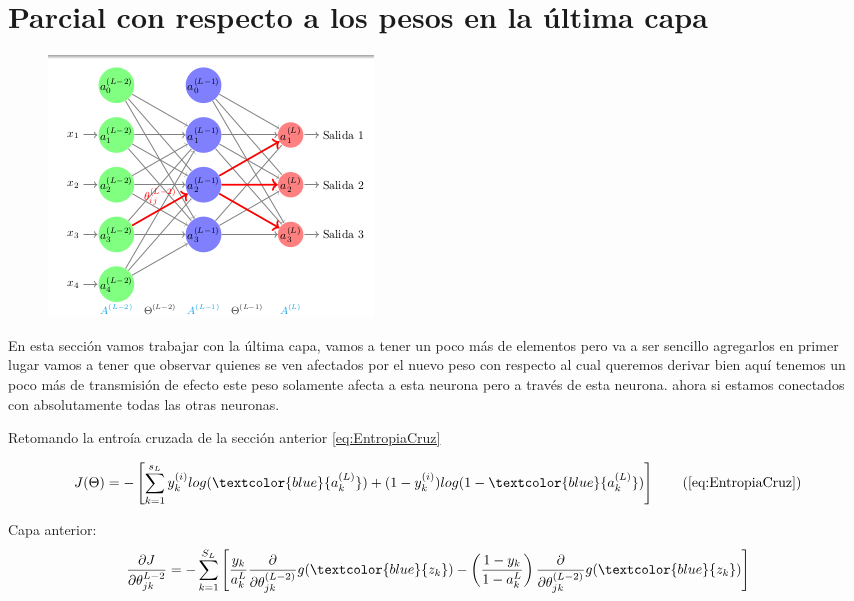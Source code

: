 \section{Parcial con respecto a los pesos en la última capa}

\begin{figure}[H]
 \centering
 \includegraphics[scale=0.8]{../Figuras/AredN.png}
 \label{fig:graficaLog}
\end{figure}


En esta sección vamos trabajar con la última capa, vamos a tener un poco más de elementos pero va a ser sencillo agregarlos en primer lugar vamos a tener que observar quienes se ven afectados por el nuevo peso con respecto al cual queremos derivar bien aquí tenemos un poco más de transmisión de efecto este peso solamente afecta a esta neurona pero a través de esta neurona. ahora si estamos conectados con absolutamente todas las otras neuronas.

Retomando la entroía cruzada de la sección anterior \ref{eq:EntropiaCruz}

 \begin{equation}
  J (\Theta) = -\left[\sum_{k=1}^{s_{L}}y_{k}^{(i)} log(\textcolor{blue}{a_{k}^{(L)}}) + (1-y_{k}^{(i)}) log(1 - \textcolor{blue} {a_{k}^{(L)}})  \right] 
  \tag{\ref{eq:EntropiaCruz}}
 \end{equation}
 
 Capa anterior:
  \begin{equation}
  \dfrac{\partial J}{\partial \theta_{jk}^{L-2}} = - \sum_{k=1}^{S_{L}}\left[ \dfrac{y_{k}}{a_{k}^{L}} \dfrac{\partial}{\partial\theta_{jk}^{(L-2)}} g(\textcolor{blue}{z_{k}}) - \left(\dfrac{1 - y_{k}}{1 - a_{k}^{L}} \right) \dfrac{\partial}{\partial \theta_{jk}^{(L-2)}}g( \textcolor{blue}{z_{k}} )\right]
 \end{equation}

